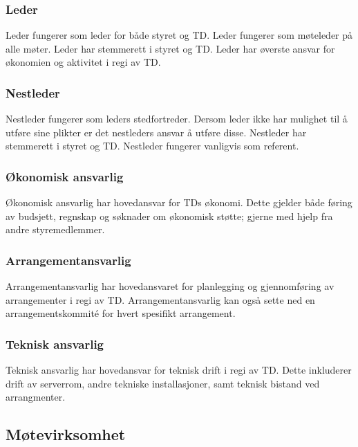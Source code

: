\documentclass[11pt]{article}
\begin{document}
\subsubsection{Leder}
Leder fungerer som leder for både styret og TD. Leder fungerer som møteleder på alle møter. Leder har stemmerett i styret og TD. Leder har øverste ansvar for økonomien og aktivitet i regi av TD.
\subsubsection{Nestleder}
Nestleder fungerer som leders stedfortreder. Dersom leder ikke har mulighet til å utføre sine plikter er det nestleders ansvar å utføre disse. Nestleder har stemmerett i styret og TD. Nestleder fungerer vanligvis som referent.
\subsubsection{Økonomisk ansvarlig}
Økonomisk ansvarlig har hovedansvar for TDs økonomi. Dette gjelder både føring av budsjett, regnskap og søknader om økonomisk støtte; gjerne med hjelp fra andre styremedlemmer.
\subsubsection{Arrangementansvarlig}
Arrangementansvarlig har hovedansvaret for planlegging og gjennomføring av arrangementer i regi av TD. Arrangementansvarlig kan også sette ned en arrangementskommité for hvert spesifikt arrangement.
\subsubsection{Teknisk ansvarlig}
Teknisk ansvarlig har hovedansvar for teknisk drift i regi av TD. Dette inkluderer drift av serverrom, andre tekniske installasjoner, samt teknisk bistand ved arrangmenter.

\subsection{Møtevirksomhet}
\end{document}
